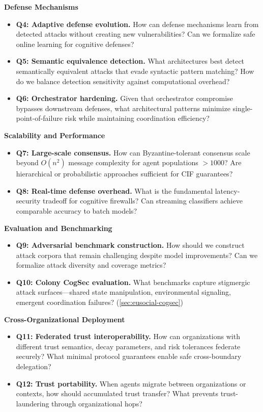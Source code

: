 \documentclass[
]{article}
\begin{document}
\textbf{Defense Mechanisms}

\begin{itemize}
\item
  \textbf{Q4: Adaptive defense evolution.} How can defense mechanisms
  learn from detected attacks without creating new vulnerabilities? Can
  we formalize safe online learning for cognitive defenses?
\item
  \textbf{Q5: Semantic equivalence detection.} What architectures best
  detect semantically equivalent attacks that evade syntactic pattern
  matching? How do we balance detection sensitivity against
  computational overhead?
\item
  \textbf{Q6: Orchestrator hardening.} Given that orchestrator
  compromise bypasses downstream defenses, what architectural patterns
  minimize single-point-of-failure risk while maintaining coordination
  efficiency?
\end{itemize}

\textbf{Scalability and Performance}

\begin{itemize}
\item
  \textbf{Q7: Large-scale consensus.} How can Byzantine-tolerant
  consensus scale beyond \(O(n^2)\) message complexity for agent
  populations \(>1000\)? Are hierarchical or probabilistic approaches
  sufficient for CIF guarantees?
\item
  \textbf{Q8: Real-time defense overhead.} What is the fundamental
  latency-security tradeoff for cognitive firewalls? Can streaming
  classifiers achieve comparable accuracy to batch models?
\end{itemize}

\textbf{Evaluation and Benchmarking}

\begin{itemize}
\item
  \textbf{Q9: Adversarial benchmark construction.} How should we
  construct attack corpora that remain challenging despite model
  improvements? Can we formalize attack diversity and coverage metrics?
\item
  \textbf{Q10: Colony CogSec evaluation.} What benchmarks capture
  stigmergic attack surfaces---shared state manipulation, environmental
  signaling, emergent coordination failures?
  (\cref{sec:eusocial-cogsec})
\end{itemize}

\textbf{Cross-Organizational Deployment}

\begin{itemize}
\item
  \textbf{Q11: Federated trust interoperability.} How can organizations
  with different trust semantics, decay parameters, and risk tolerances
  federate securely? What minimal protocol guarantees enable safe
  cross-boundary delegation?
\item
  \textbf{Q12: Trust portability.} When agents migrate between
  organizations or contexts, how should accumulated trust transfer? What
  prevents trust-laundering through organizational hops?
\end{itemize}
\end{document}

